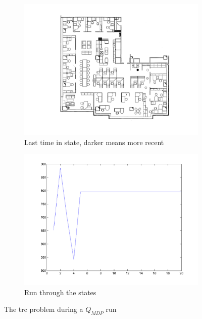 \documentclass[10pt,a4paper]{article}
\begin{document}
\begin{figure}
        \centering
        \begin{subfigure}{0.48\textwidth}
        		\includegraphics[width=\textwidth]{Paths/trc/plot-QMDP-part1-7002556633.png}
                \caption{Last time in state, darker means more recent}
                \label{fig:path_trc_part1}
                \hspace{10pt}
        \end{subfigure}
        \quad
        \begin{subfigure}{0.48\textwidth}
        		\includegraphics[width=\textwidth]{Paths/trc/plot-QMDP-part2-7002556633.png}
                \caption{Run through the states}
                \label{fig:path_trc_part2}
                \hspace{-10pt}
        \end{subfigure}
        \caption{The trc problem during a $Q_{MDP}$ run}
        \label{fig:trc_qmdp}
\end{figure}
\end{document}
